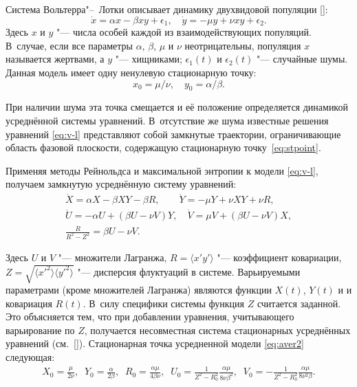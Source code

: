 \smallskip

Система Вольтерра"--~Лотки описывает динамику двухвидовой популяции []:
\begin{equation}
\dot{x}=\alpha x - \beta x y + \epsilon_1, \quad\dot{y}=-\mu y +
\nu x y + \epsilon_2. \label{eq:v-l}
\end{equation}
Здесь $x$ и $y$ "--- числа особей каждой из взаимодействующих популяций. 
В~случае, если все параметры $\alpha$, $\beta$, $\mu$ и $\nu$ неотрицательны, популяция $x$ называется жертвами, а $y$
"--- хищниками; 
$\epsilon_1(t)$ и $\epsilon_2(t)$ "--- случайные шумы. 
Данная модель имеет одну ненулевую стационарную точку:
\begin{equation}
x_0= {\mu}/{\nu}, \quad y_0= {\alpha}/{\beta}.
\label{eq:stpoint}
\end{equation}

При наличии шума эта точка смещается и её положение определяется динамикой усреднённой системы уравнений. 
В~отсутствие же шума известные решения уравнений \eqref{eq:v-l} представляют собой замкнутые траектории, ограничивающие область фазовой плоскости, содержащую стационарную точку~\eqref{eq:stpoint}.

Применяя методы Рейнольдса и максимальной энтропии к модели \eqref{eq:v-l}, получаем замкнутую усреднённую систему уравнений:
\begin{gather}
\dot{X}=\alpha X - \beta X Y - \beta R, \qquad \dot{Y}=-\mu Y + \nu X Y + \nu R, \\
\dot{U}=-\alpha U + (\beta U - \nu V)Y, \quad \dot{V}=\mu V + (\beta U - \nu V)X,    \label{eq:aver2} \\
\frac {R}{R^2-Z^2}=\beta U - \nu V.
\end{gather}

\noindent
Здесь $U$ и $V$ "--- множители Лагранжа, $R=\langle x'y' \rangle$ "--- коэффициент ковариации, $Z=\sqrt{\langle x'^2\rangle \langle y'^2\rangle}$ "--- дисперсия флуктуаций в системе. 
Варьируемыми параметрами (кроме множителей Лагранжа) являются функции $X(t)$, $Y(t)$ и и ковариация $R(t)$. 
В~силу специфики системы функция $Z$ считается заданной. 
Это объясняется тем, что при добавлении уравнения, учитывающего варьирование по $Z$, получается несовместная система стационарных усреднённых уравнений (см.~[]). 
Стационарная точка усредненной модели \eqref{eq:aver2} следующая:
\begin{gather}
X_0= \frac {\mu}{2\nu}, \; \;
Y_0=\frac {\alpha}{2\beta}, \;  \;
R_0= \frac {\alpha \mu}{4 \beta \nu},\; \;
U_0= \frac {1}{Z^2-R_0^2} \frac {\alpha \mu}{8 \nu \beta^2}, \; \;
V_0= -\frac {1}{Z^2-R_0^2} \frac {\alpha \mu}{8 \nu^2 \beta}.
\end{gather}

